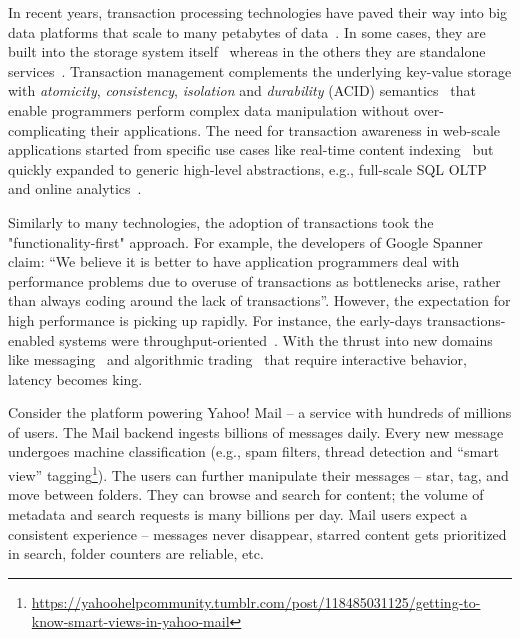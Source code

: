 In recent years, transaction processing technologies have paved their way into big data 
platforms that scale to many petabytes of data~\cite{Spanner2012,Percolator2010,Omid2017}. 
In some cases, they are built into the storage system itself~\cite{Spanner2012} whereas in the 
others they are standalone services~\cite{Omid2017}. Transaction management complements 
the underlying key-value storage with {\em atomicity}, {\em consistency}, {\em isolation\/} and 
{\em durability} (ACID) semantics~\cite{Gray:1992:TPC:573304} that enable programmers perform 
complex data manipulation without over-complicating their applications. The need for transaction awareness 
in web-scale applications started from specific use cases like real-time content indexing~\cite{Percolator2010,
Omid2017} but quickly expanded to generic high-level abstractions, e.g., full-scale SQL OLTP and 
online analytics~\cite{Phoenix, F1-2013}.

Similarly to many technologies, the adoption of transactions took the "functionality-first" approach. 
For example, the developers of Google Spanner~\cite{Spanner2012} claim: ``We believe it
is better to have application programmers deal with performance problems due to overuse 
of transactions as bottlenecks arise, rather than always coding around the lack of transactions''. 
However, the expectation for high performance is picking up rapidly. For instance, the early-days  
transactions-enabled systems were throughput-oriented~\cite{Percolator2010, Omid2017}. 
With the thrust into new domains like messaging~\cite{Borthakur:2011} and algorithmic 
trading~\cite{opentsdb} that require interactive behavior, latency becomes king. 

Consider the platform powering Yahoo! Mail -- a service with hundreds of millions of users. 
The Mail backend ingests billions of messages daily. Every new message undergoes machine 
classification (e.g., spam filters, thread detection and ``smart view'' tagging\footnote{\footnotesize{\url{
https://yahoohelpcommunity.tumblr.com/post/118485031125/getting-to-know-smart-views-in-yahoo-mail}}}). 
The users can further manipulate their messages -- star, tag, and move between folders.    
They can browse and search for content; the volume of metadata and search requests 
is many billions per day.  Mail users expect a consistent experience -- messages never 
disappear, starred content gets prioritized in search, folder counters are reliable, etc.

